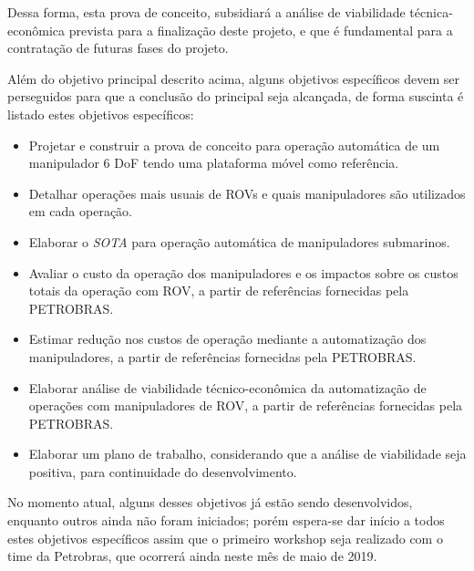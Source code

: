 Dessa forma, esta prova de conceito, subsidiará a análise de viabilidade técnica-econômica prevista para a finalização deste projeto, e que é fundamental para a contratação de futuras fases do projeto.

Além do objetivo principal descrito acima, alguns objetivos específicos devem ser perseguidos para que a conclusão do principal seja alcançada, de forma suscinta é listado estes objetivos específicos:
\begin{itemize}
	\item Projetar e construir a prova de conceito para operação automática de um manipulador 6 \acs{DoF} tendo uma plataforma móvel como referência.
	\item Detalhar operações mais usuais de ROVs e quais manipuladores são utilizados em cada operação.
	\item Elaborar o \textit{\acs{SOTA}} para operação automática de manipuladores submarinos.
	\item Avaliar o custo da operação dos manipuladores e os impactos sobre os custos totais da operação com \acs{ROV}, a partir de referências fornecidas pela PETROBRAS.
	\item Estimar redução nos custos de operação mediante a automatização dos manipuladores, a partir de referências fornecidas pela PETROBRAS.
	\item Elaborar análise de viabilidade técnico-econômica da automatização de operações com manipuladores de \acs{ROV}, a partir de referências fornecidas pela PETROBRAS.
	\item Elaborar um plano de trabalho, considerando que a análise de viabilidade seja positiva, para continuidade do desenvolvimento.
\end{itemize}

No momento atual, alguns desses objetivos já estão sendo desenvolvidos, enquanto outros ainda não foram iniciados; porém espera-se dar início a todos estes objetivos específicos assim que o primeiro workshop seja realizado com o time da Petrobras, que ocorrerá ainda neste mês de maio de 2019.

